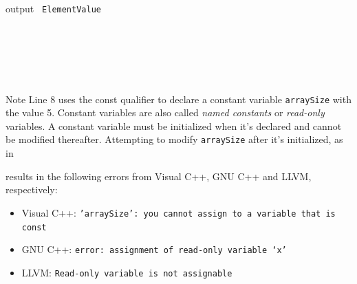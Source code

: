 \documentclass[10pt]{beamer}
\begin{document}
\begin{frame}
	\begin{block}{\color{white}output}
		\texttt{\scriptsize 
			Element\:\:\:Value\\
			\:\:\:\:\:\:\:\:\:\:\:\:\:\:\:\:\:\:\:\:\:\:\:\:\:2\\
			\:\:\:\:\:\:\:\:\:\:\:\:\:\:\:\:\:\:\:\:\:\:\:\:\:4\\
			\:\:\:\:\:\:\:\:\:\:\:\:\:\:\:\:\:\:\:\:\:\:\:\:\:6\\
			\:\:\:\:\:\:\:\:\:\:\:\:\:\:\:\:\:\:\:\:\:\:\:\:\:8\\
			\:\:\:\:\:\:\:\:\:\:\:\:\:\:\:\:\:\:\:\:\:\:\:10\\}
	\end{block}

	\begin{exampleblock}{Note}
		Line 8 uses the const qualifier to declare a {\color{purple}constant variable} \texttt{arraySize} with the value	5. Constant variables are also called \emph{\color{blue}named constants} or \emph{\color{blue}read-only} variables. A constant variable must be initialized when it’s declared and cannot be modified thereafter. Attempting to modify \texttt{arraySize} after it’s initialized, as in
		
		
		\linebreak
		results in the following errors from Visual C++, GNU C++ and LLVM, respectively:
		\begin{itemize}
			\item Visual C++: \texttt{\footnotesize 'arraySize': you cannot assign to a variable that is const}
			\item GNU C++: \texttt{\footnotesize error: assignment of read-only variable ‘x’}
			\item LLVM: \texttt{\footnotesize Read-only variable is not assignable}
		\end{itemize}
	\end{exampleblock}
\end{frame}
\end{document}
